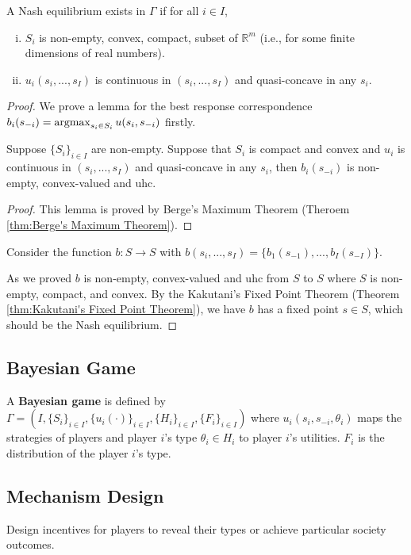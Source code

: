 \documentclass[11pt]{elegantbook}
\newcommand{\argmax}{\operatornamewithlimits{argmax}}
\begin{document}
\begin{theorem}
    A Nash equilibrium exists in $\Gamma$ if for all $i\in I$,
    \begin{enumerate}[(i).]
        \item $S_i$ is non-empty, convex, compact, subset of $\mathbb{R}^m$ (i.e., for some finite dimensions of real numbers).
        \item $u_i(s_i,...,s_I)$ is continuous in $(s_i,...,s_I)$ and quasi-concave in any $s_i$.
    \end{enumerate}
\end{theorem}
\begin{proof}
    We prove a lemma for the best response correspondence $b_i(s_{-i})=\argmax_{s_i\in S_i}u(s_i,s_{-i})$ firstly.
    \begin{lemma}
        Suppose $\{S_i\}_{i\in I}$ are non-empty. Suppose that $S_i$ is compact and convex and $u_i$ is continuous in $(s_i,...,s_I)$ and quasi-concave in any $s_i$, then $b_i(s_{-i})$ is non-empty, convex-valued and uhc.
    \end{lemma}
    \begin{proof}
        This lemma is proved by Berge's Maximum Theorem (Theroem \ref{thm:Berge's Maximum Theorem}).
    \end{proof}
    Consider the function $b: S \rightarrow S$ with $b(s_i,...,s_I)=\{b_1(s_{-1}),...,b_I(s_{-I})\}$.

    As we proved $b$ is non-empty, convex-valued and uhc from $S$ to $S$ where $S$ is non-empty, compact, and convex. By the Kakutani's Fixed Point Theorem (Theorem \ref{thm:Kakutani's Fixed Point Theorem}), we have $b$ has a fixed point $s\in S$, which should be the Nash equilibrium.
\end{proof}

\subsection{Bayesian Game}
\begin{definition}
    \normalfont
    A \textbf{Bayesian game} is defined by $\Gamma=(I, \{S_i\}_{i\in I}, \{u_i(\cdot)\}_{i\in I},\{H_i\}_{i\in I}, \{F_i\}_{i\in I})$
    where $u_i(s_i,s_{-i},\theta_i)$ maps the strategies of players and player $i$'s type $\theta_i\in H_i$ to player $i$'s utilities. $F_i$ is the distribution of the player $i$'s type.
\end{definition}


\subsection{Mechanism Design}
Design incentives for players to reveal their types or achieve particular society outcomes.
\end{document}
